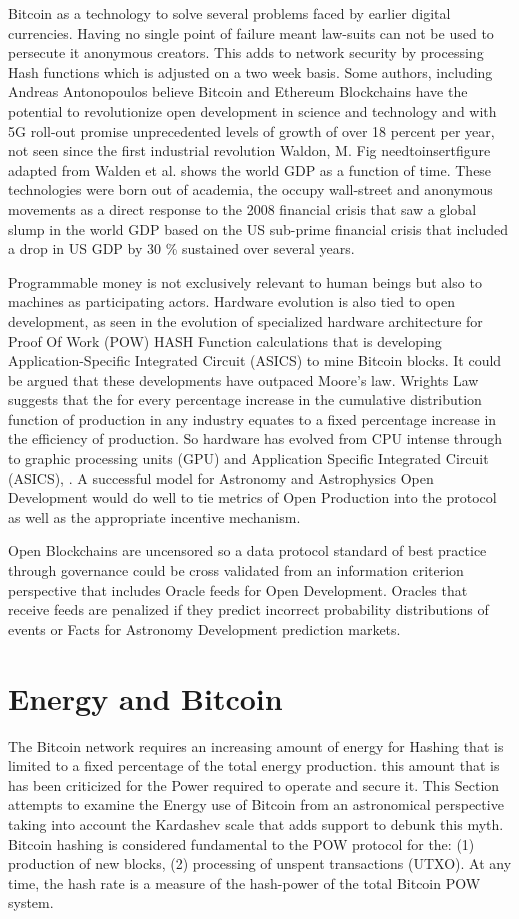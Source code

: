 \documentclass[final,5p,times,twocolumn,authoryear]{elsarticle}
\begin{document}
Bitcoin as a technology to solve several problems faced by earlier digital currencies. Having no single point of failure meant law-suits can not be used to persecute it anonymous creators. This adds to network security by processing Hash functions which is adjusted on a two week basis. Some authors, including Andreas Antonopoulos believe Bitcoin and Ethereum Blockchains have the potential to revolutionize open development in science and technology and with 5G roll-out promise unprecedented levels of growth of over 18 percent per year, not seen since the first industrial revolution Waldon, M.  Fig needtoinsertfigure adapted from Walden et al. shows the world GDP as a function of time. These technologies were born out of academia, the occupy wall-street and anonymous movements as a direct response to the 2008 financial crisis that saw a global slump in the world GDP based on the US sub-prime financial crisis  that included a drop in US GDP by 30 \% sustained over several years.
 
Programmable money is not exclusively relevant to human beings but also to machines as participating actors. Hardware evolution is also tied to open development, as seen in the evolution of specialized hardware architecture for Proof Of Work (POW) HASH Function calculations that is developing Application-Specific Integrated Circuit (ASICS) to mine Bitcoin blocks. It could be argued that these developments have outpaced Moore's law.  Wrights Law suggests that the for every percentage increase in the cumulative distribution function of production in any industry equates to a fixed percentage increase in the efficiency of production. So hardware has evolved from CPU intense through to graphic processing units (GPU) and  Application Specific Integrated Circuit  (ASICS), \cite{10.1371/journal.pone.0052669}. A successful model for Astronomy and Astrophysics Open Development would do well to tie metrics of Open Production into the protocol as well as the appropriate incentive mechanism.       

Open Blockchains are uncensored so a data protocol standard of best practice through governance could be cross validated from an information criterion perspective that includes Oracle feeds for Open Development.  Oracles that receive feeds are penalized if they predict incorrect probability distributions of events or Facts for Astronomy Development prediction markets. 

\section{Energy and Bitcoin}
\label{sec:energy}
The Bitcoin network requires an increasing amount of energy for Hashing that is limited to a fixed percentage of the total energy production. this amount  that is  has been criticized for the Power required to operate and secure it. This Section attempts to examine the Energy use of Bitcoin from an astronomical perspective taking into account the Kardashev \cite{kar64} scale that adds support to debunk this myth. Bitcoin hashing is considered fundamental to the POW protocol for the: (1) production of new blocks, (2) processing of unspent transactions (UTXO). At any time, the hash rate is a measure of the hash-power of the total Bitcoin POW system.  
\end{document}
